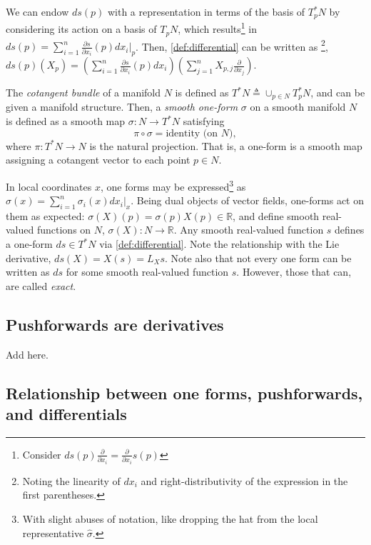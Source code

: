 \documentclass[psamsfonts]{amsart}
\theoremstyle{definition}
\theoremstyle{remark}
\newcommand*\R{\mathds{R}}
\newcommand*\isdefined{\triangleq}
\newcommand{\fracpartial}[2]{\frac{\partial #1}{\partial  #2}}
\numberwithin{equation}{section}
\begin{document}
We can endow $ds(p)$ with a representation in terms of the basis of $T^*_pN$ by considering its action on a basis of $T_pN$, which results\footnote{{\color{red}Consider $ds(p)\fracpartial{ }{x_i} = \fracpartial{}{x_i}s(p)$ }} in $ds(p) =\sum_{i = 1}^n \frac{\partial s}{\partial x_i}(p)dx_i\vert_p$. Then, \eqref{def:differential} can be written as \footnote{Noting the linearity of $dx_i$ and right-distributivity of the expression in the first parentheses.}, $ds(p)(X_p) = \left(\sum_{i = 1}^n \frac{\partial s}{\partial x_i}(p)dx_i  \right)\left(\sum_{j = 1}^nX_{p, j}\frac{\partial}{\partial x_j}\right)$. 

The \textit{cotangent bundle} of a manifold $N$ is defined as $T^*N \isdefined \cup_{p\in N}T_p^*N$, and can be given a manifold structure. Then, a \textit{smooth one-form} $\sigma$ on a smooth manifold $N$ is defined as a smooth map $\sigma : N \rightarrow T^*N$ satisfying $$\pi \circ \sigma = \text{identity (on } N),$$ where $\pi: T^*N \rightarrow N$ is the natural projection. That is, a one-form is a smooth map assigning a cotangent vector to each point $p\in N$.

In local coordinates $x$, one forms may be expressed\footnote{With slight abuses of notation, like dropping the hat from the local representative $\hat \sigma$.} as $\sigma(x) = \sum_{i=1}^n \sigma_i(x)dx_i\vert_{x}$. Being dual objects of vector fields, one-forms act on them as expected: $\sigma(X)(p) = \sigma(p)X(p) \in \R$, and define smooth real-valued functions on $N$, $\sigma(X) : N \rightarrow \R$. Any smooth real-valued function $s$ defines a one-form $ds\in T^*N$ via \eqref{def:differential}. Note the relationship with the Lie derivative, $ds(X) = X(s) = L_Xs$. Note also that not every one form can be written as $ds$ for some smooth real-valued function $s$. However, those that can, are called \textit{exact}. 

\subsection{Pushforwards are derivatives}
Add here. 
\subsection{Relationship between one forms, pushforwards, and differentials}
\end{document}
